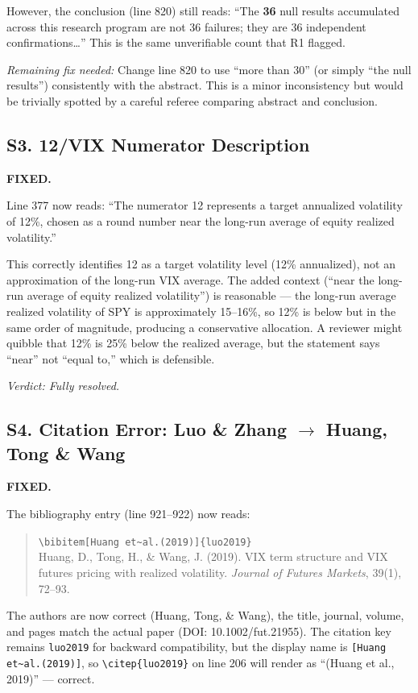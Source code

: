 \documentclass[12pt,a4paper]{article}
\begin{document}
However, the conclusion (line 820) still reads: ``The \textbf{36} null results accumulated across this research program are not 36 failures; they are 36 independent confirmations\ldots'' This is the same unverifiable count that R1 flagged.

\textit{Remaining fix needed:} Change line 820 to use ``more than 30'' (or simply ``the null results'') consistently with the abstract. This is a minor inconsistency but would be trivially spotted by a careful referee comparing abstract and conclusion.


\subsection*{S3. 12/VIX Numerator Description}
\textcolor{fixedblue}{\textbf{FIXED.}}

Line 377 now reads: ``The numerator 12 represents a target annualized volatility of 12\%, chosen as a round number near the long-run average of equity realized volatility.''

This correctly identifies 12 as a target volatility level (12\% annualized), not an approximation of the long-run VIX average. The added context (``near the long-run average of equity realized volatility'') is reasonable --- the long-run average realized volatility of SPY is approximately 15--16\%, so 12\% is below but in the same order of magnitude, producing a conservative allocation. A reviewer might quibble that 12\% is 25\% below the realized average, but the statement says ``near'' not ``equal to,'' which is defensible.

\noindent\textit{Verdict: Fully resolved.}


\subsection*{S4. Citation Error: Luo \& Zhang $\to$ Huang, Tong \& Wang}
\textcolor{fixedblue}{\textbf{FIXED.}}

The bibliography entry (line 921--922) now reads:
\begin{quote}
\texttt{\textbackslash bibitem[Huang et\~{}al.(2019)]\{luo2019\}}\\
Huang, D., Tong, H., \& Wang, J. (2019). VIX term structure and VIX futures pricing with realized volatility. \textit{Journal of Futures Markets}, 39(1), 72--93.
\end{quote}

The authors are now correct (Huang, Tong, \& Wang), the title, journal, volume, and pages match the actual paper (DOI: 10.1002/fut.21955). The citation key remains \texttt{luo2019} for backward compatibility, but the display name is \texttt{[Huang et\~{}al.(2019)]}, so \texttt{\textbackslash citep\{luo2019\}} on line 206 will render as ``(Huang et al., 2019)'' --- correct.
\end{document}
